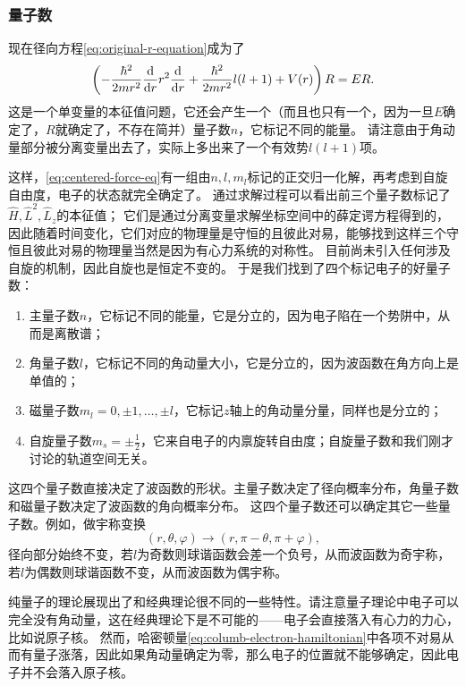 \documentclass[UTF8, a4paper]{ctexart}
\begin{document}
\subsubsection{量子数}

现在径向方程\eqref{eq:original-r-equation}成为了
\begin{equation}
    \left( - \frac{\hbar^2}{2m r^2} \dv{r} r^2 \dv{r} + \frac{\hbar^2}{2m r^2} l(l+1) + V(r) \right) R = E R.
    \label{eq:r-equation}
\end{equation}
这是一个单变量的本征值问题，它还会产生一个（而且也只有一个，因为一旦$E$确定了，$R$就确定了，不存在简并）量子数$n$，它标记不同的能量。
请注意由于角动量部分被分离变量出去了，实际上多出来了一个有效势$l(l+1)$项。

这样，\eqref{eq:centered-force-eq}有一组由$n, l, m_l$标记的正交归一化解，再考虑到自旋自由度，电子的状态就完全确定了。
通过求解过程可以看出前三个量子数标记了$\hat{H}, \hat{L}^2, \hat{L}_z$的本征值；
它们是通过分离变量求解坐标空间中的薛定谔方程得到的，因此随着时间变化，它们对应的物理量是守恒的且彼此对易，能够找到这样三个守恒且彼此对易的物理量当然是因为有心力系统的对称性。
目前尚未引入任何涉及自旋的机制，因此自旋也是恒定不变的。
于是我们找到了四个标记电子的好量子数：
\begin{enumerate}
    \item 主量子数$n$，它标记不同的能量，它是分立的，因为电子陷在一个势阱中，从而是离散谱；
    \item 角量子数$l$，它标记不同的角动量大小，它是分立的，因为波函数在角方向上是单值的；
    \item 磁量子数$m_l = 0, \pm 1, \ldots, \pm l$，它标记$z$轴上的角动量分量，同样也是分立的；
    \item 自旋量子数$m_s = \pm \frac{1}{2}$，它来自电子的内禀旋转自由度；自旋量子数和我们刚才讨论的轨道空间无关。
\end{enumerate}

这四个量子数直接决定了波函数的形状。主量子数决定了径向概率分布，角量子数和磁量子数决定了波函数的角向概率分布。
这四个量子数还可以确定其它一些量子数。例如，做宇称变换
\[
    (r, \theta, \varphi) \longrightarrow (r, \pi - \theta, \pi + \varphi),
\]
径向部分始终不变，若$l$为奇数则球谐函数会差一个负号，从而波函数为奇宇称，若$l$为偶数则球谐函数不变，从而波函数为偶宇称。

纯量子的理论展现出了和经典理论很不同的一些特性。请注意量子理论中电子可以完全没有角动量，这在经典理论下是不可能的——电子会直接落入有心力的力心，比如说原子核。
然而，哈密顿量\eqref{eq:columb-electron-hamiltonian}中各项不对易从而有量子涨落，因此如果角动量确定为零，那么电子的位置就不能够确定，因此电子并不会落入原子核。
\end{document}
